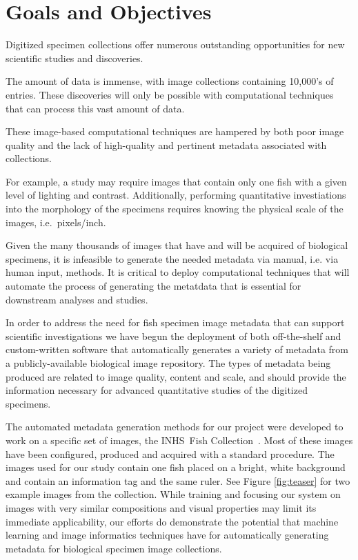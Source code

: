 \documentclass[conference]{IEEEtran}
\begin{document}
\section{Goals and Objectives}

Digitized specimen collections offer numerous outstanding opportunities
for new scientific studies and discoveries.

The amount of data is immense, with image collections containing 10,000's
of entries. These discoveries will only be possible
with computational techniques that can process this vast amount of data.

These image-based computational techniques are hampered by both poor
image quality and the lack of high-quality and pertinent metadata
associated with collections.

For example, a study may require images that contain only one fish with a
given level of lighting and contrast. Additionally, performing quantitative
investiations into the morphology of the specimens requires knowing
the physical scale of the images, i.e.~pixels/inch.

Given the many thousands of images that have and will be acquired of
biological specimens, it is infeasible to generate the needed metadata
via manual, i.e. via human input, methods.  It is critical to deploy
computational techniques that will automate the process of generating
the metatdata that is essential for downstream analyses and studies.

In order to address the need for fish specimen image metadata that can
support scientific investigations we have begun the deployment of
both off-the-shelf and custom-written software that automatically
generates a variety of metadata from a publicly-available biological
image repository.  The types of metadata being produced are related
to image quality, content and scale, and should provide the information
necessary for advanced quantitative studies of the digitized specimens.

The automated metadata generation methods for our project were developed
to work on a specific set of images, the INHS\ Fish
Collection~\cite{INHS}.  Most of these images have been configured,
produced and acquired with a standard procedure.  The images used for
our study contain one fish placed on a bright, white background and
contain an information tag and the same ruler.  See
Figure \ref{fig:teaser} for two example images from the collection.
While training and focusing our system on images with very similar
compositions and visual properties may limit its immediate applicability,
our efforts do demonstrate the potential that machine learning and
image informatics techniques have for automatically generating metadata
for biological specimen image collections.
\end{document}
